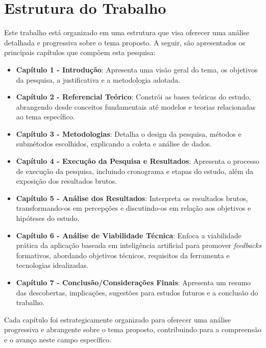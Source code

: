 \section{Estrutura do Trabalho}

Este trabalho está organizado em uma estrutura que visa oferecer uma análise detalhada e progressiva sobre o tema proposto. A seguir, são apresentados os principais capítulos que compõem esta pesquisa:

\begin{itemize}
    \item \textbf{Capítulo 1 - Introdução}: Apresenta uma visão geral do tema, os objetivos da pesquisa, a justificativa e a metodologia adotada.
    
    \item \textbf{Capítulo 2 - Referencial Teórico}: Constrói as bases teóricas do estudo, abrangendo desde conceitos fundamentais até modelos e teorias relacionadas ao tema específico.
    
    \item \textbf{Capítulo 3 - Metodologias}: Detalha o design da pesquisa, métodos e submétodos escolhidos, explicando a coleta e análise de dados.
    
    \item \textbf{Capítulo 4 - Execução da Pesquisa e Resultados}: Apresenta o processo de execução da pesquisa, incluindo cronograma e etapas do estudo, além da exposição dos resultados brutos.
    
    \item \textbf{Capítulo 5 - Análise dos Resultados}: Interpreta os resultados brutos, transformando-os em percepções e discutindo-os em relação aos objetivos e hipóteses do estudo.
    
    \item \textbf{Capítulo 6 - Análise de Viabilidade Técnica}: Enfoca a viabilidade prática da aplicação baseada em inteligência artificial para promover \textit{feedbacks} formativos, abordando objetivos técnicos, requisitos da ferramenta e tecnologias idealizadas.
    
    \item \textbf{Capítulo 7 - Conclusão/Considerações Finais}: Apresenta um resumo das descobertas, implicações, sugestões para estudos futuros e a conclusão do trabalho.
\end{itemize}

Cada capítulo foi estrategicamente organizado para oferecer uma análise progressiva e abrangente sobre o tema proposto, contribuindo para a compreensão e o avanço neste campo específico.

